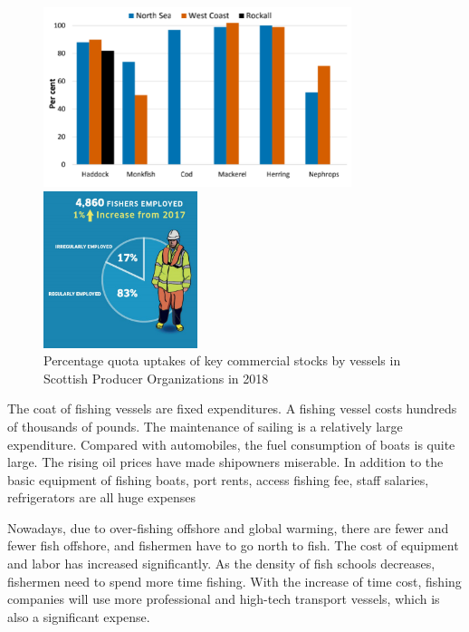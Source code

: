 \documentclass{mcmthesis}
\begin{document}
			\begin{figure}[htbp]
				\centering
				\begin{minipage}[c]{0.5\textwidth}
					\centering
					\includegraphics[width=9cm]{./picture/figure5.png}
				\end{minipage}%
				\begin{minipage}[c]{0.5\textwidth}
					\centering
					\includegraphics[width=4.5cm]{./picture/figure6.png}
				\end{minipage}
				\caption{Percentage quota uptakes of key commercial stocks by vessels in Scottish Producer Organizations in 2018}
			\end{figure}
			
The coat of fishing vessels are fixed expenditures. A fishing vessel costs hundreds of thousands of pounds. The maintenance of sailing is a relatively large expenditure. Compared with automobiles, the fuel consumption of boats is quite large. The rising oil prices have made shipowners miserable.
In addition to the basic equipment of fishing boats, port rents, access fishing fee, staff salaries, refrigerators are all huge expenses

Nowadays, due to over-fishing offshore and global warming, there are fewer and fewer fish  offshore, and fishermen have to go north to fish. The cost of equipment and labor has increased significantly. As the density of fish schools decreases, fishermen need to spend more time fishing. With the increase of time cost, fishing companies will use more professional and high-tech transport vessels, which is also a significant expense.
\end{document}
